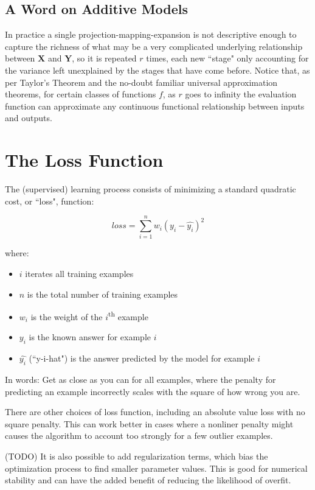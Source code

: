 \documentclass[12pt]{article}
\begin{document}
\subsection{A Word on Additive Models}

In practice a single projection-mapping-expansion is not descriptive enough to capture the richness of what may be a very complicated underlying relationship between $\pmb{X}$ and $\pmb{Y}$, so it is repeated $r$ times, each new ``stage" only accounting for the variance left unexplained by the stages that have come before. Notice that, as per Taylor's Theorem and the no-doubt familiar universal approximation theorems, for certain classes of functions $f$, as $r$ goes to infinity the evaluation function can approximate any continuous functional relationship between inputs and outputs.

\section{The Loss Function}

The (supervised) learning process consists of minimizing a standard quadratic cost, or ``loss", function:

$$loss = \sum_{i=1}^n w_i (y_i - \hat{y_i})^2$$

where:
\begin{itemize}
	\setlength\itemsep{-2mm}
	\item $i$ iterates all training examples
	\item $n$ is the total number of training examples
	\item $w_i$ is the weight of the $i$\textsuperscript{th} example
	\item $y_i$ is the known answer for example $i$
	\item $\hat{y_i}$ (``y-i-hat") is the answer predicted by the model for example $i$
\end{itemize}

In words: Get as close as you can for all examples, where the penalty for predicting an example incorrectly scales with the square of how wrong you are.

There are other choices of loss function, including an absolute value loss with no square penalty. This can work better in cases where a nonliner penalty might causes the algorithm to account too strongly for a few outlier examples.

(TODO) It is also possible to add regularization terms, which bias the optimization process to find smaller parameter values. This is good for numerical stability and can have the added benefit of reducing the likelihood of overfit.
\end{document}
